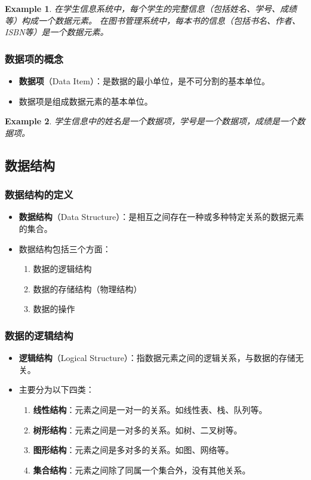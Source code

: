 \documentclass{../../note}
\newtheorem{example}{Example}
\begin{document}
\begin{example}
  在学生信息系统中，每个学生的完整信息（包括姓名、学号、成绩等）构成一个数据元素。
  在图书管理系统中，每本书的信息（包括书名、作者、ISBN等）是一个数据元素。
\end{example}

\subsubsection{数据项的概念}
\begin{itemize}
  \item \textbf{数据项}（Data Item）：是数据的最小单位，是不可分割的基本单位。
  \item 数据项是组成数据元素的基本单位。
\end{itemize}

\begin{example}
  学生信息中的姓名是一个数据项，学号是一个数据项，成绩是一个数据项。
\end{example}

\subsection{数据结构}

\subsubsection{数据结构的定义}
\begin{itemize}
  \item \textbf{数据结构}（Data Structure）：是相互之间存在一种或多种特定关系的数据元素的集合。
  \item 数据结构包括三个方面：
    \begin{enumerate}
      \item 数据的逻辑结构
      \item 数据的存储结构（物理结构）
      \item 数据的操作
    \end{enumerate}
\end{itemize}

\subsubsection{数据的逻辑结构}
\begin{itemize}
  \item \textbf{逻辑结构}（Logical Structure）：指数据元素之间的逻辑关系，与数据的存储无关。
  \item 主要分为以下四类：
    \begin{enumerate}
      \item \textbf{线性结构}：元素之间是一对一的关系。如线性表、栈、队列等。
      \item \textbf{树形结构}：元素之间是一对多的关系。如树、二叉树等。
      \item \textbf{图形结构}：元素之间是多对多的关系。如图、网络等。
      \item \textbf{集合结构}：元素之间除了同属一个集合外，没有其他关系。
    \end{enumerate}
\end{itemize}
\end{document}
